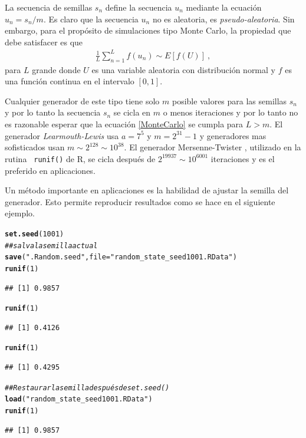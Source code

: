 \documentclass[12pt,reqno]{amsart}\usepackage[]{graphicx}\usepackage[]{color}
\makeatletter
\newcommand{\hlnum}[1]{\textcolor[rgb]{0.686,0.059,0.569}{#1}}%
\newcommand{\hlstr}[1]{\textcolor[rgb]{0.192,0.494,0.8}{#1}}%
\newcommand{\hlcom}[1]{\textcolor[rgb]{0.678,0.584,0.686}{\textit{#1}}}%
\newcommand{\hlstd}[1]{\textcolor[rgb]{0.345,0.345,0.345}{#1}}%
\newcommand{\hlkwc}[1]{\textcolor[rgb]{0.333,0.667,0.333}{#1}}%
\newcommand{\hlkwd}[1]{\textcolor[rgb]{0.737,0.353,0.396}{\textbf{#1}}}%
\newenvironment{kframe}{%
 \def\at@end@of@kframe{}%
 \ifinner\ifhmode%
  \def\at@end@of@kframe{\end{minipage}}%
  \begin{minipage}{\columnwidth}%
 \fi\fi%
 \def\FrameCommand##1{\hskip\@totalleftmargin \hskip-\fboxsep
 \colorbox{shadecolor}{##1}\hskip-\fboxsep
     \hskip-\linewidth \hskip-\@totalleftmargin \hskip\columnwidth}%
 \MakeFramed {\advance\hsize-\width
   \@totalleftmargin\z@ \linewidth\hsize
   \@setminipage}}%
 {\par\unskip\endMakeFramed%
 \at@end@of@kframe}
\newenvironment{knitrout}{}{} %
\makeatother
\begin{document}
La secuencia de semillas $s_n$ define la secuencia $u_n$ mediante la ecuación $u_n = s_n / m$. Es claro que la secuencia $u_n$ no es aleatoria, es \emph{pseudo-aleatoria}. Sin embargo, para el propósito de simulaciones tipo Monte Carlo, la propiedad que debe satisfacer es que
\begin{equation}\label{MonteCarlo}
  \begin{split}
	\frac{1}{L}\sum_{n=1}^{L} f(u_n) \sim E[f(U)]\:,
	\end{split}
\end{equation}
para $L$ grande donde $U$ es una variable aleatoria con distribución normal y $f$ es una función continua en el intervalo $[0,1]$.

Cualquier generador de este tipo tiene solo $m$ posible valores para las semillas $s_n$ y por lo tanto la secuencia $s_n$ se cicla en $m$ o menos iteraciones y por lo tanto no es razonable esperar que la ecuación \eqref{MonteCarlo} se cumpla para $L > m$. El generador \emph{Learmouth-Lewis} usa $a = 7^5$ y $ m = 2^{31}-1$ y generadores mas sofisticados usan $ m \sim 2^{128}\sim 10^{38} $. El generador Mersenne-Twister , utilizado en la rutina \verb+ runif()+ de R, se cicla después de $2^{19937}\sim 10^{6001}$ iteraciones y es el preferido en aplicaciones.

Un método importante en aplicaciones es la habilidad de ajustar la semilla del generador. Esto permite reproducir resultados como se hace en el siguiente ejemplo.
\begin{knitrout}
\color{fgcolor}\begin{kframe}
\begin{alltt}
\hlkwd{set.seed}\hlstd{(}\hlnum{1001}\hlstd{)}
\hlcom{## salva la semilla actual}
\hlkwd{save}\hlstd{(}\hlstr{".Random.seed"}\hlstd{,} \hlkwc{file} \hlstd{=} \hlstr{"random_state_seed1001.RData"}\hlstd{)}
\hlkwd{runif}\hlstd{(}\hlnum{1}\hlstd{)}
\end{alltt}
\begin{verbatim}
## [1] 0.9857
\end{verbatim}
\begin{alltt}
\hlkwd{runif}\hlstd{(}\hlnum{1}\hlstd{)}
\end{alltt}
\begin{verbatim}
## [1] 0.4126
\end{verbatim}
\begin{alltt}
\hlkwd{runif}\hlstd{(}\hlnum{1}\hlstd{)}
\end{alltt}
\begin{verbatim}
## [1] 0.4295
\end{verbatim}
\begin{alltt}
\hlcom{## Restaurar la semilla después de set.seed()}
\hlkwd{load}\hlstd{(}\hlstr{"random_state_seed1001.RData"}\hlstd{)}
\hlkwd{runif}\hlstd{(}\hlnum{1}\hlstd{)}
\end{alltt}
\begin{verbatim}
## [1] 0.9857
\end{verbatim}
\end{kframe}
\end{knitrout}
\end{document}
